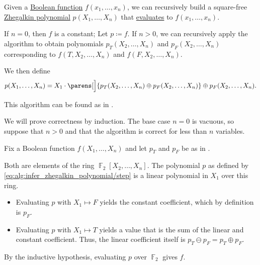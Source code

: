 \begin{algorithm}\label{alg:infer_zhegalkin_polynomial}
  Given a \hyperref[def:boolean_function]{Boolean function} \( f(x_1, \ldots, x_n) \), we can recursively build a square-free \hyperref[def:zhegalkin_polynomial]{Zhegalkin polynomial} \( p(X_1, \ldots, X_n) \) that \hyperref[con:substitution_homomorphism]{evaluates} to \( f(x_1, \ldots, x_n) \).

  \begin{thmenum}
     If \( n = 0 \), then \( f \) is a constant; Let \( p \coloneqq f \).
     If \( n > 0 \), we can recursively apply the algorithm to obtain polynomials \( p_T(X_2, \ldots, X_n) \) and \( p_F(X_2, \ldots, X_n) \) corresponding to \( f(T, X_2, \ldots, X_n) \) and \( f(F, X_2, \ldots, X_n) \).

    We then define
    \begin{equation}\label{eq:alg:infer_zhegalkin_polynomial/step}
      p(X_1, \ldots, X_n) = X_1 \cdot \parens[\Big]{ p_T(X_2, \ldots, X_n) \oplus p_F(X_2, \ldots, X_n) } \oplus p_F(X_2, \ldots, X_n).
    \end{equation}
  \end{thmenum}
\end{algorithm}
\begin{comments}
  \item This algorithm can be found as  in \cite{notebook:code}.
\end{comments}
\begin{defproof}
  We will prove correctness by induction. The base case \( n = 0 \) is vacuous, so suppose that \( n > 0 \) and that the algorithm is correct for less than \( n \) variables.

  Fix a Boolean function \( f(X_1, \ldots, X_n) \) and let \( p_T \) and \( p_F \) be as in .

  Both are elements of the ring \( \BbbF_2[X_2, \ldots, X_n] \). The polynomial \( p \) as defined by \eqref{eq:alg:infer_zhegalkin_polynomial/step} is a linear polynomial in \( X_1 \) over this ring.
  \begin{itemize}
    \item Evaluating \( p \) with \( X_1 \mapsto F \) yields the constant coefficient, which by definition is \( p_F \).
    \item Evaluating \( p \) with \( X_1 \mapsto T \) yields a value that is the sum of the linear and constant coefficient. Thus, the linear coefficient itself is \( p_T \ominus p_F = p_T \oplus p_F \).
  \end{itemize}

  By the inductive hypothesis, evaluating \( p \) over \( \BbbF_2 \) gives \( f \).
\end{defproof}

